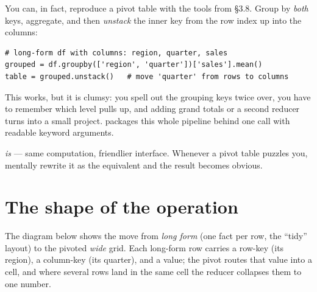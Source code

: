 \documentclass[11pt]{article}
\begin{document}
You can, in fact, reproduce a pivot table with the tools from \S3.8. Group by \emph{both} keys, aggregate, and then \emph{unstack} the inner key from the row index up into the columns:

\begin{lstlisting}
# long-form df with columns: region, quarter, sales
grouped = df.groupby(['region', 'quarter'])['sales'].mean()
table = grouped.unstack()   # move 'quarter' from rows to columns
\end{lstlisting}

This works, but it is clumsy: you spell out the grouping keys twice over, you have to remember which level  pulls up, and adding grand totals or a second reducer turns into a small project.  packages this whole pipeline behind one call with readable keyword arguments.

\begin{keyidea}
 \emph{is}  --- same computation, friendlier interface. Whenever a pivot table puzzles you, mentally rewrite it as the equivalent  and the result becomes obvious.
\end{keyidea}

\section{The shape of the operation}

The diagram below shows the move from \emph{long form} (one fact per row, the ``tidy'' layout) to the pivoted \emph{wide} grid. Each long-form row carries a row-key (its region), a column-key (its quarter), and a value; the pivot routes that value into a cell, and where several rows land in the same cell the reducer collapses them to one number.
\end{document}
